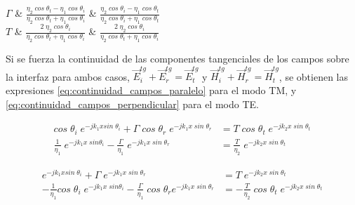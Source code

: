\begin{table}
\begin{tabu}
		$\Gamma$
		&
		$\frac{\eta_2\; cos\; \theta_t - \eta_1 \; cos\; \theta_i}{\eta_2\; cos\; \theta_t + \eta_1 \; cos\; \theta_i}$
		&
		$\frac{\eta_2\; cos\; \theta_i - \eta_1 \; cos\; \theta_t}{\eta_2\; cos\; \theta_i + \eta_1 \; cos\; \theta_t}$
		\\
		$T$
		&
		$\frac{2 \;\eta_2 \; cos\; \theta_i}{\eta_2\; cos\; \theta_t + \eta_1 \; cos\; \theta_i}$
		&
		$\frac{2\; \eta_2 \; cos\; \theta_i}{\eta_2\; cos\; \theta_t + \eta_1 \; cos\; \theta_i}$
	\end{tabu}
	\caption{Campos incidentes, transmitidos y reflejados, y coeficientes de reflexión y transmisión para incidencia oblicua de una onda plana sobre una interfaz dieléctrica}
	\label{table:incidencia_oblicua}
\end{table}

Si se fuerza la continuidad de las componentes tangenciales de los campos sobre la interfaz para ambos casos, $\vec{E}_i^{tg} + \vec{E}_r^{tg} = \vec{E}_t^{tg}$ y $\vec{H}_i^{tg} + \vec{H}_r^{tg} = \vec{H}_t^{tg}$, se obtienen las expresiones \ref{eq:continuidad_campos_paralelo} para el modo TM, y \ref{eq:continuidad_campos_perpendicular} para el modo TE.

\begin{subequations}
	\label{eq:continuidad_campos_paralelo}
	\begin{align}
		cos \; \theta_i \; e^{-j k_1 x sin \; \theta_i} + \Gamma \; cos \; \theta_r \; e^{-j k_1 x \; sin\; \theta_r} &= T\; cos\; \theta_t \; e^{-j k_2 x \; sin\; \theta_t}\\
		\frac{1}{\eta_1} \; e^{-j k_1 x \; sin \theta_i} - \frac{\Gamma}{\eta_1} \; e^{-j k_1 x \; sin \; \theta_r} &= \frac{T}{\eta_2} \; e^{-j k_2 x \; sin\; \theta_t}
	\end{align}
\end{subequations}

\begin{subequations}
	\label{eq:continuidad_campos_perpendicular}
	\begin{align}
	e^{-j k_1 x sin \; \theta_i} + \Gamma \; e^{-j k_1 x \; sin\; \theta_r} &= T\; e^{-j k_2 x \; sin\; \theta_t}\\
	-\frac{1}{\eta_1} cos\; \theta_i \; e^{-j k_1 x \; sin \theta_i} - \frac{\Gamma}{\eta_1} \; cos\; \theta_r e^{-j k_1 x \; sin \; \theta_r} &= -\frac{T}{\eta_2} \; cos\; \theta_t \; e^{-j k_2 x \; sin\; \theta_t}
	\end{align}
\end{subequations}

